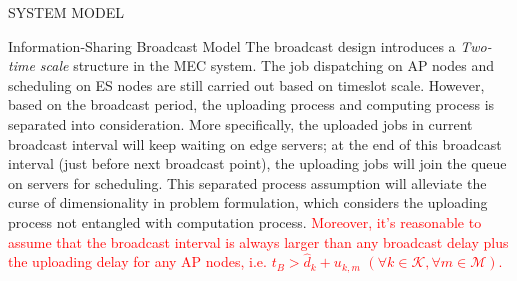 \documentclass[10pt, conference, letterpaper]{IEEEtran}
\newcommand{\apSet}{\mathcal{K}}
\newcommand{\esSet}{\mathcal{M}}
\begin{document}
\begin{section}{SYSTEM MODEL}
\begin{subsection}{Information-Sharing Broadcast Model}
            The broadcast design introduces a \emph{Two-time scale} structure in the MEC system. The job dispatching on AP nodes and scheduling on ES nodes are still carried out based on timeslot scale. However, based on the broadcast period, the uploading process and computing process is separated into consideration.
            More specifically, the uploaded jobs in current broadcast interval will keep waiting on edge servers; at the end of this broadcast interval (just before next broadcast point), the uploading jobs will join the queue on servers for scheduling. This separated process assumption will alleviate the curse of dimensionality in problem formulation, which considers the uploading process not entangled with computation process.
            \textcolor{red}{Moreover, it's reasonable to assume that the broadcast interval is always larger than any broadcast delay plus the uploading delay for any AP nodes, i.e. $t_B > \hat{d}_{k} + u_{k,m}$ $(\forall k\in\apSet, \forall m\in\esSet)$.}
        \end{subsection}
    \end{section}
\end{document}
